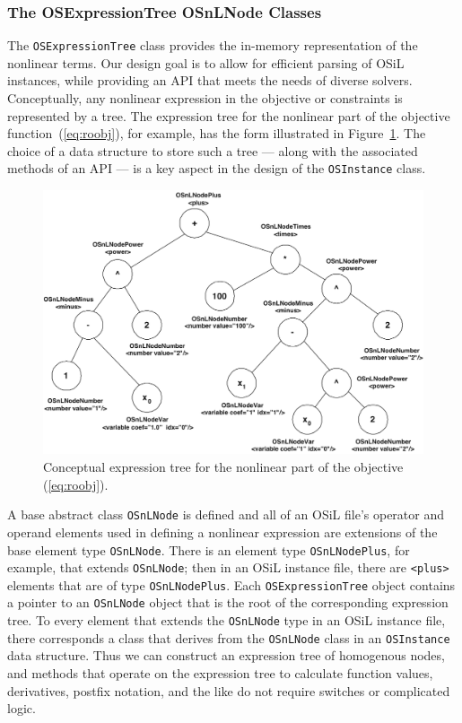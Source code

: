 \documentclass[11pt]{article}
\newcommand{\figurepath}{./figures}
\newcounter{Fig}
\renewcommand{\_}{{\char"5F}}
\renewcommand{\{}{{\char"7B}}
\renewcommand{\}}{{\char"7D}}
\renewcommand{\^}{{\char"0D}}
\renewcommand{\'}{{\char"0D}}
\begin{document}
\begin{enumerate}[Step 1:]
\subsubsection{The OSExpressionTree OSnLNode Classes}\label{section:osexpressiontreeclass}

The {\tt OSExpressionTree} class provides the in-memory representation
of the nonlinear terms.  Our design goal is  to allow for efficient parsing of OSiL instances,
while providing an API that meets the needs of diverse solvers.  Conceptually, any nonlinear expression in the
objective or constraints is represented by a tree.  The expression tree for the nonlinear part of the
objective function~(\ref{eq:roobj}), for example, has the form illustrated in Figure~\ref{figure:expressiontree}.
The choice of a data structure to store such a tree --- along with the associated methods of an API --- is a key aspect
in the design of the {\tt OSInstance} class.

\begin{figure}[ht]
\centering
\includegraphics[scale=0.38]{./figures/expressiontree.png}
\caption{Conceptual expression tree for the nonlinear part of the objective (\ref{eq:roobj}).}\label{figure:expressiontree}
\end{figure}


A base abstract class {\tt OSnLNode} is defined and  all of an OSiL file's
operator and operand elements used in defining a
nonlinear expression are extensions of the base element type {\tt OSnLNode}. There is an element type {\tt OSnLNodePlus}, 
for example, that extends {\tt OSnLNode}; then in an OSiL instance file, there are {\tt <plus>} elements that 
are of type {\tt OSnLNodePlus}.   Each {\tt OSExpressionTree} object contains a pointer to an {\tt OSnLNode} object 
that is the root of the corresponding expression tree.  To every element that extends the {\tt OSnLNode} type in an 
OSiL instance file, there corresponds a class that derives from the {\tt OSnLNode} class in an {\tt OSInstance} 
data structure.  Thus we can construct an expression tree of homogenous nodes, and methods that operate on the 
expression tree to calculate function values, derivatives, postfix notation, and the like do not require switches 
or complicated logic.



\end{enumerate}
\end{document}
